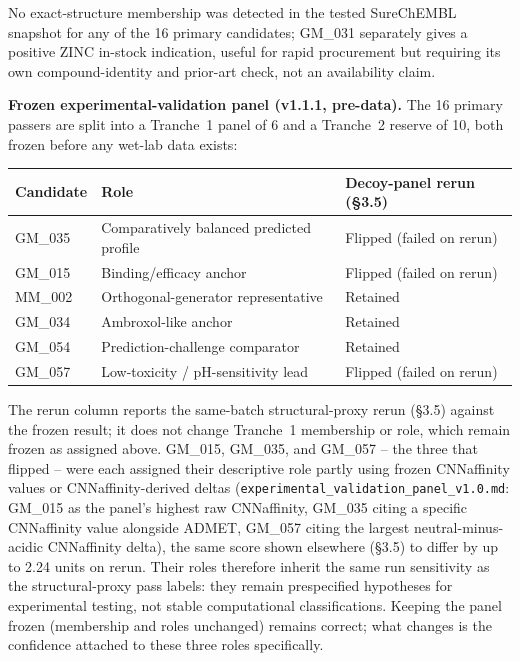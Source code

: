 \documentclass{article}
\begin{document}
No exact-structure membership was detected in the tested SureChEMBL snapshot for any of the 16 primary candidates; GM\_031 separately gives a positive ZINC in-stock indication, useful for rapid procurement but requiring its own compound-identity and prior-art check, not an availability claim.

\textbf{Frozen experimental-validation panel (v1.1.1, pre-data).} The 16 primary passers are split into a Tranche~1 panel of 6 and a Tranche~2 reserve of 10, both frozen before any wet-lab data exists:

\begin{table}[H]
\centering
\footnotesize
\begin{tabular}{lll}
\toprule
Candidate & Role & Decoy-panel rerun (\S3.5) \\
\midrule
GM\_035 & Comparatively balanced predicted profile & Flipped (failed on rerun) \\
GM\_015 & Binding/efficacy anchor & Flipped (failed on rerun) \\
MM\_002 & Orthogonal-generator representative & Retained \\
GM\_034 & Ambroxol-like anchor & Retained \\
GM\_054 & Prediction-challenge comparator & Retained \\
GM\_057 & Low-toxicity / pH-sensitivity lead & Flipped (failed on rerun) \\
\bottomrule
\end{tabular}
\end{table}

The rerun column reports the same-batch structural-proxy rerun (\S3.5) against the frozen result; it does not change Tranche~1 membership or role, which remain frozen as assigned above. GM\_015, GM\_035, and GM\_057 -- the three that flipped -- were each assigned their descriptive role partly using frozen CNNaffinity values or CNNaffinity-derived deltas (\texttt{experimental\_validation\_panel\_v1.0.md}: GM\_015 as the panel's highest raw CNNaffinity, GM\_035 citing a specific CNNaffinity value alongside ADMET, GM\_057 citing the largest neutral-minus-acidic CNNaffinity delta), the same score shown elsewhere (\S3.5) to differ by up to 2.24 units on rerun. Their roles therefore inherit the same run sensitivity as the structural-proxy pass labels: they remain prespecified hypotheses for experimental testing, not stable computational classifications. Keeping the panel frozen (membership and roles unchanged) remains correct; what changes is the confidence attached to these three roles specifically.
\end{document}
